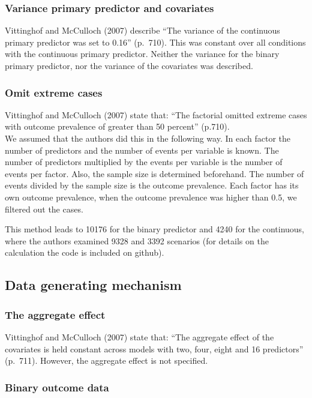 \documentclass[10,a4paperpaper,]{article}
\begin{document}
\subsubsection{Variance primary predictor and covariates}

Vittinghof and McCulloch (2007) describe ``The variance of the
continuous primary predictor was set to 0.16'' (p.~710). This was
constant over all conditions with the continuous primary predictor.
Neither the variance for the binary primary predictor, nor the variance
of the covariates was described.

\subsubsection{Omit extreme cases}

Vittinghof and McCulloch (2007) state that: ``The factorial omitted
extreme cases with outcome prevalence of greater than 50 percent''
(p.710).\\
We assumed that the authors did this in the following way. In each
factor the number of predictors and the number of events per variable is
known. The number of predictors multiplied by the events per variable is
the number of events per factor. Also, the sample size is determined
beforehand. The number of events divided by the sample size is the
outcome prevalence. Each factor has its own outcome prevalence, when the
outcome prevalence was higher than 0.5, we filtered out the cases.

This method leads to 10176 for the binary predictor and 4240 for the
continuous, where the authors examined 9328 and 3392 scenarios (for
details on the calculation the code is included on github).

\subsection{Data generating mechanism}

\subsubsection{The aggregate effect}

Vittinghof and McCulloch (2007) state that: ``The aggregate effect of
the covariates is held constant across models with two, four, eight and
16 predictors'' (p.~711). However, the aggregate effect is not
specified.

\subsubsection{Binary outcome data}
\end{document}
